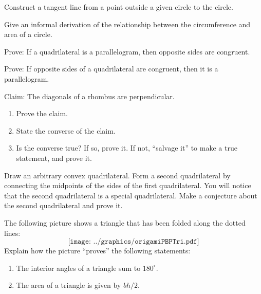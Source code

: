 \begin{prob}
Construct a tangent line from a point outside a given circle to the circle.
\end{prob}

\begin{prob}
Give an informal derivation of the relationship between the circumference and area of a circle. 
\end{prob}

\begin{prob}
Prove:  If a quadrilateral is a parallelogram, then opposite sides are congruent.
\end{prob}

\begin{prob}
Prove:  If opposite sides of a quadrilateral are congruent, then it is a parallelogram.
\end{prob}

\begin{prob}
Claim:  The diagonals of a rhombus are perpendicular. 
\begin{enumerate}
\item Prove the claim. 
\item State the converse of the claim. 
\item Is the converse true?  If so, prove it.  If not, ``salvage it'' to make a true statement, and prove it.  
\end{enumerate}
\end{prob}


\begin{prob}
Draw an arbitrary convex quadrilateral.  Form a second quadrilateral by connecting the midpoints of the sides 
of the first quadrilateral.  You will notice that the second quadrilateral is a special quadrilateral. Make a conjecture about the second quadrilateral and prove it.  
\end{prob}

\begin{prob}
The following picture shows a triangle that has been folded
  along the dotted lines:
\[
\texttt{[image: ../graphics/origamiPBPTri.pdf]}
\]
Explain how the picture ``proves'' the following statements:
\begin{enumerate}
\item The interior angles of a triangle sum to $180^\circ$. 
\item The area of a triangle is given by $bh/2$. 
\end{enumerate}
\end{prob}

